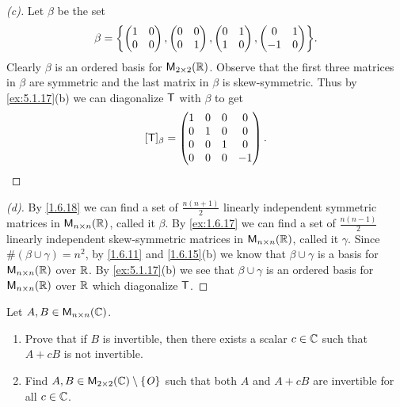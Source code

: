\begin{proof}[(c)]
  Let \(\beta\) be the set
  \[
    \beta = \set{\begin{pmatrix}
        1 & 0 \\
        0 & 0
      \end{pmatrix}, \begin{pmatrix}
        0 & 0 \\
        0 & 1
      \end{pmatrix}, \begin{pmatrix}
        0 & 1 \\
        1 & 0
      \end{pmatrix}, \begin{pmatrix}
        0  & 1 \\
        -1 & 0
      \end{pmatrix}}.
  \]
  Clearly \(\beta\) is an ordered basis for \(\mathsf{M}_{{2} \times 2}({\mathbb{R}})\).
  Observe that the first three matrices in \(\beta\) are symmetric and the last matrix in \(\beta\) is skew-symmetric.
  Thus by \cref{ex:5.1.17}(b) we can diagonalize \(\mathsf{T}\) with \(\beta\) to get
  \[
    [\mathsf{T}]_{\beta} = \begin{pmatrix}
      1 & 0 & 0 & 0  \\
      0 & 1 & 0 & 0  \\
      0 & 0 & 1 & 0  \\
      0 & 0 & 0 & -1
    \end{pmatrix}.
  \]
\end{proof}

\begin{proof}[(d)]
  By \cref{1.6.18} we can find a set of \(\frac{n(n + 1)}{2}\) linearly independent symmetric matrices in \(\mathsf{M}_{{n} \times n}({\mathbb{R}})\), called it \(\beta\).
  By \cref{ex:1.6.17} we can find a set of \(\frac{n(n - 1)}{2}\) linearly independent skew-symmetric matrices in \(\mathsf{M}_{{n} \times n}({\mathbb{R}})\), called it \(\gamma\).
  Since \(\#(\beta \cup \gamma) = n^2\), by \cref{1.6.11} and \cref{1.6.15}(b) we know that \(\beta \cup \gamma\) is a basis for \(\mathsf{M}_{{n} \times n}({\mathbb{R}})\) over \(\mathbb{R}\).
  By \cref{ex:5.1.17}(b) we see that \(\beta \cup \gamma\) is an ordered basis for \(\mathsf{M}_{{n} \times n}({\mathbb{R}})\) over \(\mathbb{R}\) which diagonalize \(\mathsf{T}\).
\end{proof}

\begin{ex}\label{ex:5.1.18}
  Let \(A, B \in \mathsf{M}_{{n} \times n}({\mathbb{C}})\).
  \begin{enumerate}
    \item Prove that if \(B\) is invertible, then there exists a scalar \(c \in \mathbb{C}\) such that \(A + cB\) is not invertible.
    \item Find \(A, B \in \mathsf{M}_{{2} \times 2}({\mathbb{C}}) \setminus \left\lbrace\mathit{O}\right\rbrace\) such that both \(A\) and \(A + cB\) are invertible for all \(c \in \mathbb{C}\).
  \end{enumerate}
\end{ex}

